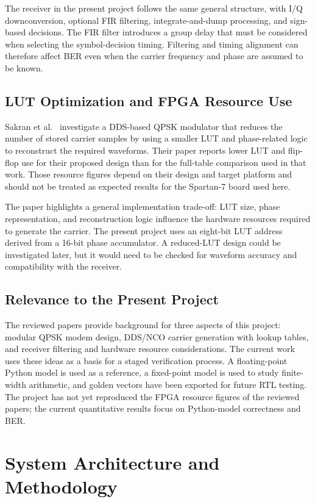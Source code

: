 \documentclass[10pt,twocolumn,letterpaper]{article}
\begin{document}
The receiver in the present project follows the same general structure, with I/Q downconversion, optional FIR filtering, integrate-and-dump processing, and sign-based decisions. The FIR filter introduces a group delay that must be considered when selecting the symbol-decision timing. Filtering and timing alignment can therefore affect BER even when the carrier frequency and phase are assumed to be known.

\subsection{LUT Optimization and FPGA Resource Use}
Sakran et al.~\cite{sakran2025qpsk} investigate a DDS-based QPSK modulator that reduces the number of stored carrier samples by using a smaller LUT and phase-related logic to reconstruct the required waveforms. Their paper reports lower LUT and flip-flop use for their proposed design than for the full-table comparison used in that work. Those resource figures depend on their design and target platform and should not be treated as expected results for the Spartan-7 board used here.

The paper highlights a general implementation trade-off: LUT size, phase representation, and reconstruction logic influence the hardware resources required to generate the carrier. The present project uses an eight-bit LUT address derived from a 16-bit phase accumulator. A reduced-LUT design could be investigated later, but it would need to be checked for waveform accuracy and compatibility with the receiver.

\subsection{Relevance to the Present Project}
The reviewed papers provide background for three aspects of this project: modular QPSK modem design, DDS/NCO carrier generation with lookup tables, and receiver filtering and hardware resource considerations. The current work uses these ideas as a basis for a staged verification process. A floating-point Python model is used as a reference, a fixed-point model is used to study finite-width arithmetic, and golden vectors have been exported for future RTL testing. The project has not yet reproduced the FPGA resource figures of the reviewed papers; the current quantitative results focus on Python-model correctness and BER.

\section{System Architecture and Methodology}
\label{sec:method}
\end{document}
